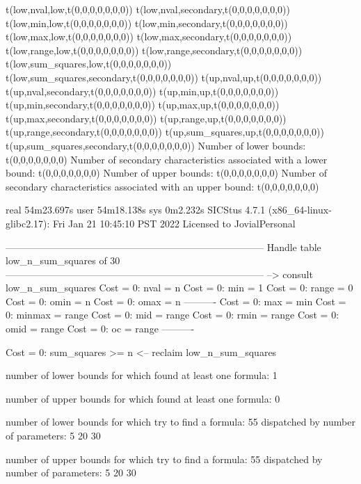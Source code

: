 t(low,nval,low,t(0,0,0,0,0,0,0))
t(low,nval,secondary,t(0,0,0,0,0,0,0))
t(low,min,low,t(0,0,0,0,0,0,0))
t(low,min,secondary,t(0,0,0,0,0,0,0))
t(low,max,low,t(0,0,0,0,0,0,0))
t(low,max,secondary,t(0,0,0,0,0,0,0))
t(low,range,low,t(0,0,0,0,0,0,0))
t(low,range,secondary,t(0,0,0,0,0,0,0))
t(low,sum_squares,low,t(0,0,0,0,0,0,0))
t(low,sum_squares,secondary,t(0,0,0,0,0,0,0))
t(up,nval,up,t(0,0,0,0,0,0,0))
t(up,nval,secondary,t(0,0,0,0,0,0,0))
t(up,min,up,t(0,0,0,0,0,0,0))
t(up,min,secondary,t(0,0,0,0,0,0,0))
t(up,max,up,t(0,0,0,0,0,0,0))
t(up,max,secondary,t(0,0,0,0,0,0,0))
t(up,range,up,t(0,0,0,0,0,0,0))
t(up,range,secondary,t(0,0,0,0,0,0,0))
t(up,sum_squares,up,t(0,0,0,0,0,0,0))
t(up,sum_squares,secondary,t(0,0,0,0,0,0,0))
Number of lower bounds:                                             t(0,0,0,0,0,0,0)
Number of secondary characteristics associated with a lower bound:  t(0,0,0,0,0,0,0)
Number of upper bounds:                                             t(0,0,0,0,0,0,0)
Number of secondary characteristics associated with an upper bound: t(0,0,0,0,0,0,0)

real	54m23.697s
user	54m18.138s
sys	0m2.232s
SICStus 4.7.1 (x86_64-linux-glibc2.17): Fri Jan 21 10:45:10 PST 2022
Licensed to JovialPersonal


--------------------------------------------------------------------------------
Handle table low_n_sum_squares of 30
--------------------------------------------------------------------------------
--> consult low_n_sum_squares
Cost =  0:  nval   = n
Cost =  0:  min    = 1
Cost =  0:  range  = 0
Cost =  0:  omin   = n
Cost =  0:  omax   = n
----------
Cost =  0:  max    = min
Cost =  0:  minmax = range
Cost =  0:  mid    = range
Cost =  0:  rmin   = range
Cost =  0:  omid   = range
Cost =  0:  oc     = range
----------

Cost =  0:  sum_squares >= n
<-- reclaim low_n_sum_squares

number of lower bounds for which found at least one formula: 1

number of upper bounds for which found at least one formula: 0

number of lower bounds for which try to find a formula: 55
dispatched by number of parameters: 5  20  30

number of upper bounds for which try to find a formula: 55
dispatched by number of parameters: 5  20  30

